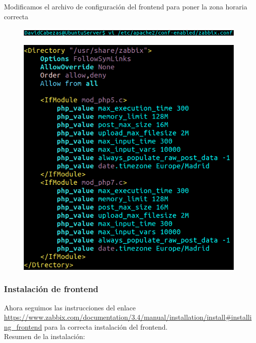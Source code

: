 \documentclass{article}
\begin{document}
Modificamos el archivo de configuración del frontend para poner la
zona horaria correcta

\begin{figure}[H]
  \centering
  \includegraphics[width=160mm]{screenshots/vi_frontend-timezone}
\end{figure}

\begin{figure}[H]
  \centering
  \includegraphics[width=120mm]{screenshots/frontend-timezone}
\end{figure}

\newpage

\subsubsection*{Instalación de frontend}

Ahora seguimos las instrucciones del enlace
\url{https://www.zabbix.com/documentation/3.4/manual/installation/install#installing_frontend}
para la correcta instalación del frontend. \\

Resumen de la instalación:
\end{document}
